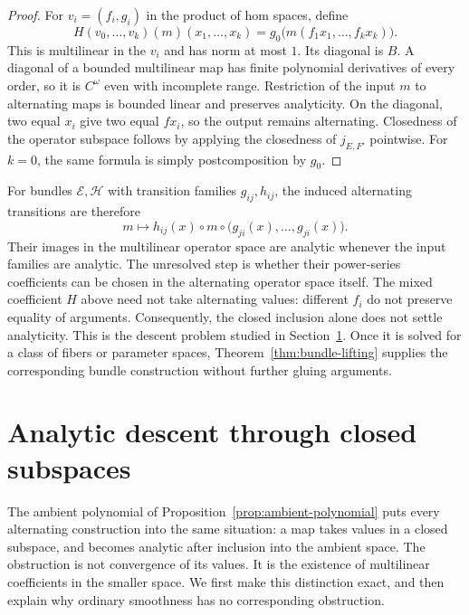 \documentclass[11pt]{amsart}
\theoremstyle{definition}
\theoremstyle{remark}
\numberwithin{equation}{section}
\begin{document}
\begin{proof}
For $v_i=(f_i,g_i)$ in the product of hom spaces, define
\[
 H(v_0,\ldots,v_k)(m)(x_1,\ldots,x_k)
 =g_0\bigl(m(f_1x_1,\ldots,f_kx_k)\bigr).
\]
This is multilinear in the $v_i$ and has norm at most $1$. Its diagonal is $B$. A diagonal of a bounded multilinear map has finite polynomial derivatives of every order, so it is $C^\omega$ even with incomplete range. Restriction of the input $m$ to alternating maps is bounded linear and preserves analyticity. On the diagonal, two equal $x_i$ give two equal $fx_i$, so the output remains alternating. Closedness of the operator subspace follows by applying the closedness of $j_{E,F'}$ pointwise. For $k=0$, the same formula is simply postcomposition by $g_0$.
\end{proof}

For bundles $\mathcal E,\mathcal H$ with transition families $g_{ij},h_{ij}$, the induced alternating transitions are therefore
\[
 m\longmapsto h_{ij}(x)\circ m\circ
       \bigl(g_{ji}(x),\ldots,g_{ji}(x)\bigr).
\]
Their images in the multilinear operator space are analytic whenever the input families are analytic. The unresolved step is whether their power-series coefficients can be chosen in the alternating operator space itself. The mixed coefficient $H$ above need not take alternating values: different $f_i$ do not preserve equality of arguments. Consequently, the closed inclusion alone does not settle analyticity. This is the descent problem studied in Section~\ref{sec:descent}. Once it is solved for a class of fibers or parameter spaces, Theorem~\ref{thm:bundle-lifting} supplies the corresponding bundle construction without further gluing arguments.

\section{Analytic descent through closed subspaces}\label{sec:descent}

The ambient polynomial of Proposition~\ref{prop:ambient-polynomial} puts every alternating construction into the same situation: a map takes values in a closed subspace, and becomes analytic after inclusion into the ambient space. The obstruction is not convergence of its values. It is the existence of multilinear coefficients in the smaller space. We first make this distinction exact, and then explain why ordinary smoothness has no corresponding obstruction.
\end{document}
